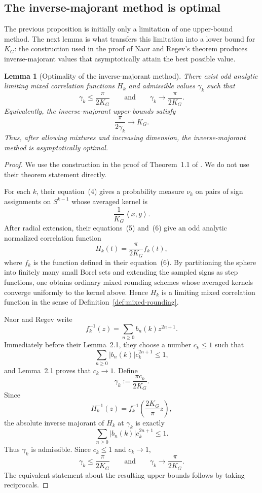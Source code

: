 \documentclass[11pt]{article}
\newtheorem{lemma}[theorem]{Lemma}
\newcommand{\ip}[2]{\left\langle #1,#2\right\rangle}
\begin{document}
\subsection{The inverse-majorant method is optimal}
\label{sec:majroant_optimal}

The previous proposition is initially only a limitation of one upper-bound method. The next lemma is what transfers this limitation into a lower bound for $K_G$: the construction used in the proof of Naor and Regev's theorem produces inverse-majorant values that asymptotically attain the best possible value.

\begin{lemma}[Optimality of the inverse-majorant method]\label{lem:inverse-majorant-optimal}
There exist odd analytic limiting mixed correlation functions $H_k$ and admissible values $\gamma_k$ such that
\[
        \gamma_k\le\frac{\pi}{2K_G}
        \qquad\text{and}\qquad
        \gamma_k\longrightarrow\frac{\pi}{2K_G}.
\]
Equivalently, the inverse-majorant upper bounds satisfy
\[
        \frac{\pi}{2\gamma_k}\longrightarrow K_G.
\]
Thus, after allowing mixtures and increasing dimension, the inverse-majorant method is asymptotically optimal.
\end{lemma}

\begin{proof}
We use the construction in the proof of Theorem~1.1 of \cite{naor2014krivine}. We do not use their theorem statement directly.

For each $k$, their equation~(4) gives a probability measure $\nu_k$ on pairs of sign assignments on $S^{k-1}$ whose averaged kernel is
\[
        \frac{1}{K_G}\ip{x}{y}.
\]
After radial extension, their equations~(5) and~(6) give an odd analytic normalized correlation function
\[
        H_k(t)=\frac{\pi}{2K_G}f_k(t),
\]
where $f_k$ is the function defined in their equation~(6).  By partitioning the sphere into finitely many small Borel sets and extending the sampled signs as step functions, one obtains ordinary mixed rounding schemes whose averaged kernels converge uniformly to the kernel above.  Hence $H_k$ is a limiting mixed correlation function in the sense of Definition~\ref{def:mixed-rounding}.

Naor and Regev write
\[
        f_k^{-1}(z)=\sum_{n\ge0}b_n(k)z^{2n+1}.
\]
Immediately before their Lemma~2.1, they choose a number $c_k\le1$ such that
\[
        \sum_{n\ge0}|b_n(k)|c_k^{2n+1}\le1,
\]
and Lemma~2.1 proves that $c_k\to1$.  Define
\[
        \gamma_k:=\frac{\pi c_k}{2K_G}.
\]
Since
\[
        H_k^{-1}(z)=f_k^{-1}\left(\frac{2K_G}{\pi}z\right),
\]
the absolute inverse majorant of $H_k$ at $\gamma_k$ is exactly
\[
        \sum_{n\ge0}|b_n(k)|c_k^{2n+1}\le1.
\]
Thus $\gamma_k$ is admissible.  Since $c_k\le1$ and $c_k\to1$,
\[
        \gamma_k\le\frac{\pi}{2K_G}
        \qquad\text{and}\qquad
        \gamma_k\longrightarrow\frac{\pi}{2K_G}.
\]
The equivalent statement about the resulting upper bounds follows by taking reciprocals.
\end{proof}
\end{document}
